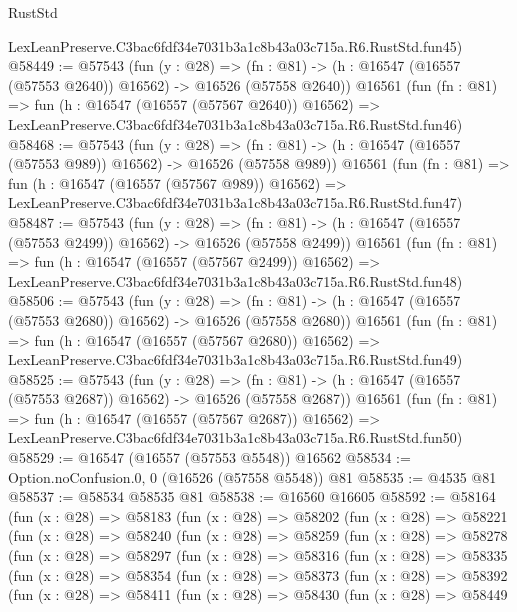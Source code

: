 \begin{lexlean}{RustStd}
\begin{coremodule}
    LexLeanPreserve.C3bac6fdf34e7031b3a1c8b43a03c715a.R6.RustStd.fun45)
@58449 := @57543
    (fun (y : @28) =>
    (fn : @81) -> (h : @16547 (@16557 (@57553 @2640)) @16562) -> @16526 (@57558 @2640))
    @16561
    (fun (fn : @81) =>
    fun (h : @16547 (@16557 (@57567 @2640)) @16562) =>
    LexLeanPreserve.C3bac6fdf34e7031b3a1c8b43a03c715a.R6.RustStd.fun46)
@58468 := @57543
    (fun (y : @28) =>
    (fn : @81) -> (h : @16547 (@16557 (@57553 @989)) @16562) -> @16526 (@57558 @989))
    @16561
    (fun (fn : @81) =>
    fun (h : @16547 (@16557 (@57567 @989)) @16562) =>
    LexLeanPreserve.C3bac6fdf34e7031b3a1c8b43a03c715a.R6.RustStd.fun47)
@58487 := @57543
    (fun (y : @28) =>
    (fn : @81) -> (h : @16547 (@16557 (@57553 @2499)) @16562) -> @16526 (@57558 @2499))
    @16561
    (fun (fn : @81) =>
    fun (h : @16547 (@16557 (@57567 @2499)) @16562) =>
    LexLeanPreserve.C3bac6fdf34e7031b3a1c8b43a03c715a.R6.RustStd.fun48)
@58506 := @57543
    (fun (y : @28) =>
    (fn : @81) -> (h : @16547 (@16557 (@57553 @2680)) @16562) -> @16526 (@57558 @2680))
    @16561
    (fun (fn : @81) =>
    fun (h : @16547 (@16557 (@57567 @2680)) @16562) =>
    LexLeanPreserve.C3bac6fdf34e7031b3a1c8b43a03c715a.R6.RustStd.fun49)
@58525 := @57543
    (fun (y : @28) =>
    (fn : @81) -> (h : @16547 (@16557 (@57553 @2687)) @16562) -> @16526 (@57558 @2687))
    @16561
    (fun (fn : @81) =>
    fun (h : @16547 (@16557 (@57567 @2687)) @16562) =>
    LexLeanPreserve.C3bac6fdf34e7031b3a1c8b43a03c715a.R6.RustStd.fun50)
@58529 := @16547 (@16557 (@57553 @5548)) @16562
@58534 := Option.noConfusion.{0, 0} (@16526 (@57558 @5548)) @81
@58535 := @4535 @81
@58537 := @58534 @58535 @81
@58538 := @16560 @16605
@58592 := @58164
    (fun (x : @28) =>
    @58183
      (fun (x : @28) =>
      @58202
        (fun (x : @28) =>
        @58221
          (fun (x : @28) =>
          @58240
            (fun (x : @28) =>
            @58259
              (fun (x : @28) =>
              @58278
                (fun (x : @28) =>
                @58297
                  (fun (x : @28) =>
                  @58316
                    (fun (x : @28) =>
                    @58335
                      (fun (x : @28) =>
                      @58354
                        (fun (x : @28) =>
                        @58373
                          (fun (x : @28) =>
                          @58392
                            (fun (x : @28) =>
                            @58411
                              (fun (x : @28) =>
                              @58430
                                (fun (x : @28) =>
                                @58449

\end{coremodule}
\end{lexlean}
